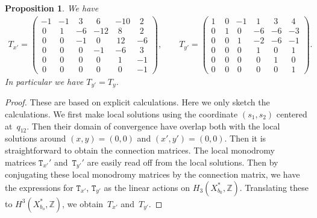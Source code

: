 \documentclass[pdftex]{sigma}
\numberwithin{equation}{section}
\newtheorem{Proposition}[Theorem]{Proposition}
\begin{document}
\begin{Proposition}\label{prop:Tx'-Ty'}We have
\begin{gather*}
T_{x'}=\left(\begin{smallmatrix}-1 & -1 & \,\,3 & \,\,6 & -10 & \,\,2\\
\,0 & \,1 & -6 & -12 & \,\,8 & \,\,2\\
\,0 & \,0 & -1 & \,\,0 & \,12 & -6\\
\,0 & \,0 & \,\,0 & -1 & -6 & \,\,3\\
\,0 & \,0 & \,\,0 & \,\,0 & \,\,1 & -1\\
\,0 & \,0 & \,\,0 & \,\,0 & \,\,0 & -1
\end{smallmatrix}\right),\qquad T_{y'}=\left(\begin{smallmatrix}1 & \,\,0 & -1 & \,\,1 & \,\,3 & \,\,4\\
0 & \,\,1 & \,0 & -6 & -6 & -3\\
0 & \,\,0 & \,1 & -2 & -6 & -1\\
0 & \,\,0 & \,0 & \,\,1 & \,\,0 & \,\,1\\
0 & \,\,0 & \,0 & \,\,0 & \,\,1 & \,\,0\\
0 & \,\,0 & \,0 & \,\,0 & \,\,0 & \,\,1
\end{smallmatrix}\right).
\end{gather*}
In particular we have $T_{y'}=T_{y}$. \end{Proposition}

\begin{proof} These are based on explicit calculations. Here we only sketch the calculations. We first make local solutions using the coordinate $(s_{1},s_{2})$ centered at~$q_{12}$. Then their domain of convergence have overlap both with the local solutions around $(x,y)=(0,0)$ and $(x',y')=(0,0)$. Then it is straightforward to obtain the connection matrices. The local monodromy matrices $\mathtt{T}_{x'}'$ and~$\mathtt{T}_{y'}'$ are easily read off from the local solutions. Then by conjugating these local monodromy matrices by the connection matrix, we have the expressions for $\mathtt{T}_{x'}$, $\mathtt{T}_{y'}$ as the linear actions on $H_{3}(X_{b_{0}}^{*},\mathbb{Z})$. Translating these to $H^{3}(X_{b_{o}}^{*},\mathbb{Z})$, we obtain~$T_{x'}$ and~$T_{y'}$.
\end{proof}
\end{document}
